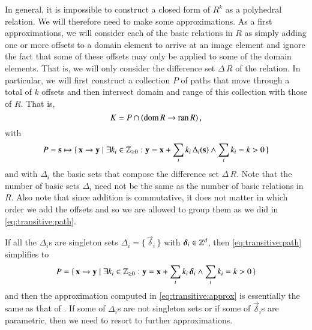 In general, it is impossible to construct a closed form
of $R^k$ as a polyhedral relation.
We will therefore need to make some approximations.
As a first approximations, we will consider each of the basic
relations in $R$ as simply adding one or more offsets to a domain element
to arrive at an image element and ignore the fact that some of these
offsets may only be applied to some of the domain elements.
That is, we will only consider the difference set $\Delta\,R$ of the relation.
In particular, we will first construct a collection $P$ of paths
that move through
a total of $k$ offsets and then intersect domain and range of this
collection with those of $R$.
That is, 
\begin{equation}
\label{eq:transitive:approx}
K = P \cap \left(\mathop{\rm dom}\nolimits R \to \mathop{\rm ran}\nolimits R\right)
,
\end{equation}
with
\begin{equation}
\label{eq:transitive:path}
P = \vec s \mapsto \{\, \vec x \to \vec y \mid
\exists k_i \in \Z_{\ge 0} :
\vec y = \vec x + \sum_i k_i \, \Delta_i(\vec s)
\wedge
\sum_i k_i = k > 0
\,\}
\end{equation}
and with $\Delta_i$ the basic sets that compose
the difference set $\Delta\,R$.
Note that the number of basic sets $\Delta_i$ need not be
the same as the number of basic relations in $R$.
Also note that since addition is commutative, it does not
matter in which order we add the offsets and so we are allowed
to group them as we did in \eqref{eq:transitive:path}.

If all the $\Delta_i$s are singleton sets
$\Delta_i = \{\, \vec \delta_i \,\}$ with $\vec \delta_i \in \Z^d$,
then \eqref{eq:transitive:path} simplifies to
\begin{equation}
\label{eq:transitive:singleton}
P = \{\, \vec x \to \vec y \mid
\exists k_i \in \Z_{\ge 0} :
\vec y = \vec x + \sum_i k_i \, \vec \delta_i
\wedge
\sum_i k_i = k > 0
\,\}
\end{equation}
and then the approximation computed in \eqref{eq:transitive:approx}
is essentially the same as that of .
If some of $\Delta_i$s are not singleton sets or if
some of $\vec \delta_i$s are parametric, then we need
to resort to further approximations.

